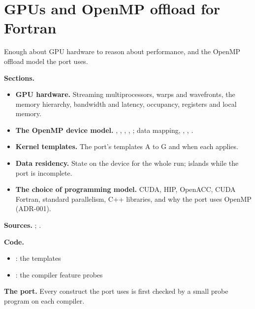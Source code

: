 \chapter{GPUs and OpenMP offload for Fortran}\label{ch:gpu}

Enough about GPU hardware to reason about performance, and the OpenMP offload model the port uses.

\begin{outline}[(card B-16)]
\textbf{Sections.}
\begin{itemize}
    \item \textbf{GPU hardware.} Streaming multiprocessors, warps and wavefronts, the memory hierarchy, bandwidth and latency, occupancy, registers and local memory.
    \item \textbf{The OpenMP device model.} , , , , ; data mapping, , , .
    \item \textbf{Kernel templates.} The port's templates A to G and when each applies.
    \item \textbf{Data residency.} State on the device for the whole run; islands while the port is incomplete.
    \item \textbf{The choice of programming model.} CUDA, HIP, OpenACC, CUDA Fortran, standard parallelism, C++ libraries, and why the port uses OpenMP (ADR-001).
\end{itemize}
\textbf{Sources.} \citet{openmp52}; .

\textbf{Code.}
\begin{itemize}
    \item {}: the templates
    \item {}: the compiler feature probes
\end{itemize}
\textbf{The port.} Every construct the port uses is first checked by a small probe program on each compiler.
\end{outline}
